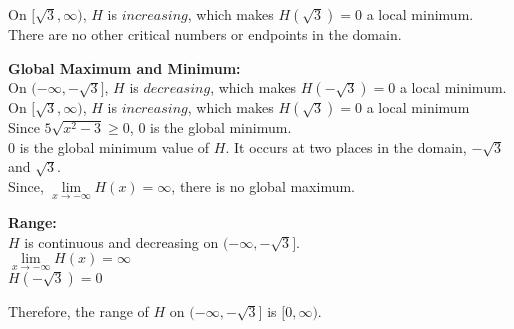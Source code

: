 \documentclass{ximera}
\begin{document}
On $[\sqrt{3}, \infty)$, $H$ is $increasing$, which makes $H(\sqrt{3}) = 0$ a local minimum.  \\



There are no other critical numbers or endpoints in the domain.









\textbf{\textcolor{blue!55!black}{Global Maximum and Minimum:}} \\



On $(-\infty, -\sqrt{3}]$, $H$ is $decreasing$, which makes $H(-\sqrt{3}) = 0$ a local minimum. \\


On $[\sqrt{3}, \infty)$, $H$ is $increasing$, which makes $H(\sqrt{3}) = 0$ a local minimum  \\




Since $5 \sqrt{x^2-3} \geq 0$, $0$ is the global minimum. \\



$0$ is the global minimum value of $H$. It occurs at two places in the domain, $-\sqrt{3}$ and $\sqrt{3}$. \\



Since, $\lim\limits_{x \to -\infty} H(x) = \infty$, there is no global maximum. 














\textbf{\textcolor{blue!55!black}{Range:}} \\



$H$ is continuous and decreasing on $( -\infty, -\sqrt{3} ]$. \\


$\lim\limits_{x \to -\infty} H(x) = \infty$ \\


$H(-\sqrt{3}) = 0$


Therefore, the range of $H$ on $( -\infty, -\sqrt{3} ]$ is $[0, \infty)$. \\
\end{document}
